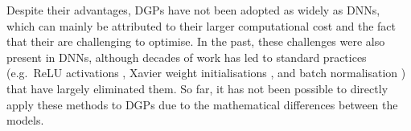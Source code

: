 Despite their advantages, DGPs have not been adopted as widely as DNNs, which can mainly be attributed to their larger computational cost and the fact that their are challenging to optimise.
In the past, these challenges were also present in DNNs, although decades of work has led to standard practices (e.g.~ReLU activations \citep{relu}, Xavier weight initialisations \citep{glorot2010understanding}, and batch normalisation \citep{batchnorm}) that have largely eliminated them. So far, it has not been possible to directly apply these methods to DGPs due to the mathematical differences between the models.





